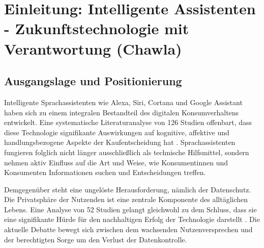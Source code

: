 
\section{Einleitung: Intelligente Assistenten - Zukunftstechnologie mit Verantwortung (Chawla)} 

\subsection{Ausgangslage und Positionierung} 
Intelligente Sprachassistenten wie Alexa, Siri, Cortana und Google Assistant haben sich zu einem integralen Bestandteil des digitalen Konsumverhaltens entwickelt. Eine systematische Literaturanalyse von 126 Studien offenbart, dass diese Technologie signifikante Auswirkungen auf kognitive, affektive und handlungsbezogene Aspekte der Kaufentscheidung hat \cite{Wu2026VoiceOfCommerce}. Sprachassistenten fungieren folglich nicht länger ausschließlich als technische Hilfsmittel, sondern nehmen aktiv Einfluss auf die Art und Weise, wie Konsumentinnen und Konsumenten Informationen suchen und Entscheidungen treffen.

Demgegenüber steht eine ungelöste Herausforderung, nämlich der Datenschutz. Die Privatsphäre der Nutzenden ist eine zentrale Komponente des alltäglichen Lebens. Eine Analyse von 52 Studien gelangt gleichwohl zu dem Schluss, dass sie eine signifikante Hürde für den nachhaltigen Erfolg der Technologie darstellt \cite{ZhangLe.2026}. Die aktuelle Debatte bewegt sich zwischen dem wachsenden Nutzenversprechen und der berechtigten Sorge um den Verlust der Datenkontrolle.

